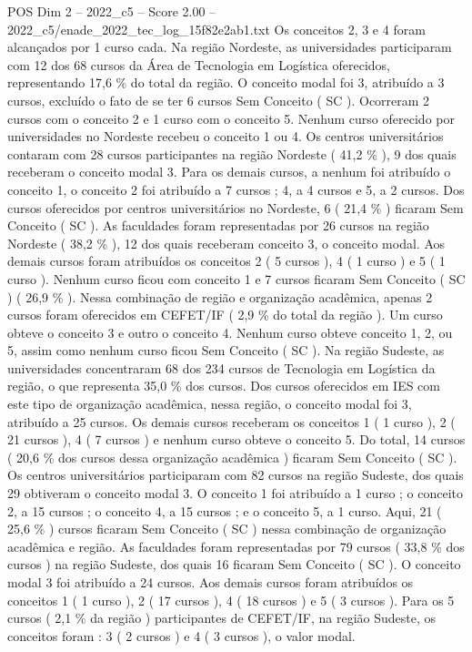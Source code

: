 \begin{textsample}{POS Dim 2 – 2022\_c5 – Score 2.00 – 2022\_c5/enade\_2022\_tec\_log\_15f82e2ab1.txt}
Os conceitos 2, 3 e 4 foram alcançados por 1 curso cada.
Na região Nordeste, as universidades participaram com 12 dos 68 cursos da Área de Tecnologia em Logística oferecidos, representando 17,6 \% do total da região.
O conceito modal foi 3, atribuído a 3 cursos, excluído o fato de se ter 6 cursos Sem Conceito ( SC ).
Ocorreram 2 cursos com o conceito 2 e 1 curso com o conceito 5.
Nenhum curso oferecido por universidades no Nordeste recebeu o conceito 1 ou 4.
Os centros universitários contaram com 28 cursos participantes na região Nordeste ( 41,2 \% ), 9 dos quais receberam o conceito modal 3.
Para os demais cursos, a nenhum foi atribuído o conceito 1, o conceito 2 foi atribuído a 7 cursos ; 4, a 4 cursos e 5, a 2 cursos.
Dos cursos oferecidos por centros universitários no Nordeste, 6 ( 21,4 \% ) ficaram Sem Conceito ( SC ).
As faculdades foram representadas por 26 cursos na região Nordeste ( 38,2 \% ), 12 dos quais receberam conceito 3, o conceito modal.
Aos demais cursos foram atribuídos os conceitos 2 ( 5 cursos ), 4 ( 1 curso ) e 5 ( 1 curso ).
Nenhum curso ficou com conceito 1 e 7 cursos ficaram Sem Conceito ( SC ) ( 26,9 \% ).
Nessa combinação de região e organização acadêmica, apenas 2 cursos foram oferecidos em CEFET/IF ( 2,9 \% do total da região ).
Um curso obteve o conceito 3 e outro o conceito 4.
Nenhum curso obteve conceito 1, 2, ou 5, assim como nenhum curso ficou Sem Conceito ( SC ).
Na região Sudeste, as universidades concentraram 68 dos 234 cursos de Tecnologia em Logística da região, o que representa 35,0 \% dos cursos.
Dos cursos oferecidos em IES com este tipo de organização acadêmica, nessa região, o conceito modal foi 3, atribuído a 25 cursos.
Os demais cursos receberam os conceitos 1 ( 1 curso ), 2 ( 21 cursos ), 4 ( 7 cursos ) e nenhum curso obteve o conceito 5.
Do total, 14 cursos ( 20,6 \% dos cursos dessa organização acadêmica ) ficaram Sem Conceito ( SC ).
Os centros universitários participaram com 82 cursos na região Sudeste, dos quais 29 obtiveram o conceito modal 3.
O conceito 1 foi atribuído a 1 curso ; o conceito 2, a 15 cursos ; o conceito 4, a 15 cursos ; e o conceito 5, a 1 curso.
Aqui, 21 ( 25,6 \% ) cursos ficaram Sem Conceito ( SC ) nessa combinação de organização acadêmica e região.
As faculdades foram representadas por 79 cursos ( 33,8 \% dos cursos ) na região Sudeste, dos quais 16 ficaram Sem Conceito ( SC ).
O conceito modal 3 foi atribuído a 24 cursos.
Aos demais cursos foram atribuídos os conceitos 1 ( 1 curso ), 2 ( 17 cursos ), 4 ( 18 cursos ) e 5 ( 3 cursos ).
Para os 5 cursos ( 2,1 \% da região ) participantes de CEFET/IF, na região Sudeste, os conceitos foram : 3 ( 2 cursos ) e 4 ( 3 cursos ), o valor modal.

\end{textsample}
